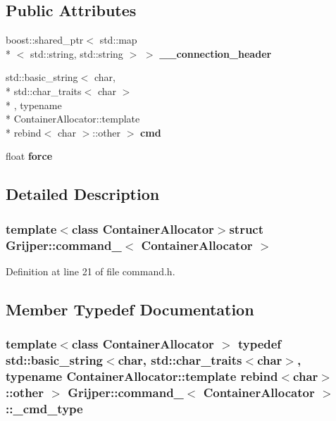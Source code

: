 \subsection*{Public Attributes}
\begin{DoxyCompactItemize}
\item 
boost\-::shared\-\_\-ptr$<$ std\-::map\\*
$<$ std\-::string, std\-::string $>$ $>$ {\bf \-\_\-\-\_\-connection\-\_\-header}
\item 
std\-::basic\-\_\-string$<$ char, \\*
std\-::char\-\_\-traits$<$ char $>$\\*
, typename \\*
Container\-Allocator\-::template \\*
rebind$<$ char $>$\-::other $>$ {\bf cmd}
\item 
float {\bf force}
\end{DoxyCompactItemize}


\subsection{Detailed Description}
\subsubsection*{template$<$class Container\-Allocator$>$struct Grijper\-::command\-\_\-$<$ Container\-Allocator $>$}



Definition at line 21 of file command.\-h.



\subsection{Member Typedef Documentation}
\subsubsection[{\-\_\-cmd\-\_\-type}]{\setlength{\rightskip}{0pt plus 5cm}template$<$class Container\-Allocator $>$ typedef std\-::basic\-\_\-string$<$char, std\-::char\-\_\-traits$<$char$>$, typename Container\-Allocator\-::template rebind$<$char$>$\-::other $>$ {\bf Grijper\-::command\-\_\-}$<$ Container\-Allocator $>$\-::{\bf \-\_\-cmd\-\_\-type}}\label{structGrijper_1_1command___aa72632ba15227629cd7a2933a4edb6f4}


